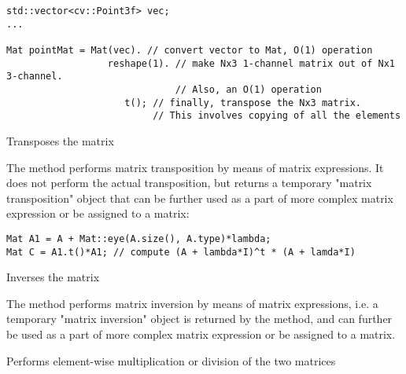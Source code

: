 \begin{lstlisting}
std::vector<cv::Point3f> vec;
...

Mat pointMat = Mat(vec). // convert vector to Mat, O(1) operation
                  reshape(1). // make Nx3 1-channel matrix out of Nx1 3-channel.
                              // Also, an O(1) operation
                     t(); // finally, transpose the Nx3 matrix.
                          // This involves copying of all the elements
\end{lstlisting} 


Transposes the matrix


The method performs matrix transposition by means of matrix expressions.
It does not perform the actual transposition, but returns a temporary "matrix transposition" object that can be further used as a part of more complex matrix expression or be assigned to a matrix:

\begin{lstlisting}
Mat A1 = A + Mat::eye(A.size(), A.type)*lambda;
Mat C = A1.t()*A1; // compute (A + lambda*I)^t * (A + lamda*I)
\end{lstlisting} 

Inverses the matrix


\begin{description}
\begin{description}
\end{description}
\end{description}

The method performs matrix inversion by means of matrix expressions, i.e. a temporary "matrix inversion" object is returned by the method, and can further be used as a part of more complex matrix expression or be assigned to a matrix.

Performs element-wise multiplication or division of the two matrices


